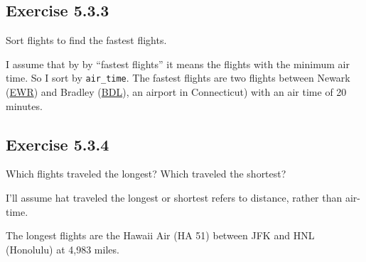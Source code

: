 \documentclass[]{book}
\newenvironment{Shaded}{\begin{snugshade}}{\end{snugshade}}
\newcommand{\CommentTok}[1]{\textcolor[rgb]{0.56,0.35,0.01}{\textit{#1}}}
\newcommand{\KeywordTok}[1]{\textcolor[rgb]{0.13,0.29,0.53}{\textbf{#1}}}
\newcommand{\NormalTok}[1]{#1}
\newcommand{\OperatorTok}[1]{\textcolor[rgb]{0.81,0.36,0.00}{\textbf{#1}}}
\newcommand{\StringTok}[1]{\textcolor[rgb]{0.31,0.60,0.02}{#1}}
\theoremstyle{plain}
\theoremstyle{remark}
\begin{document}
\hypertarget{exercise-5.3.3}{%
\subsection*{\texorpdfstring{Exercise
{5.3.3}}{Exercise 5.3.3}}\label{exercise-5.3.3}}

Sort flights to find the fastest flights.

I assume that by by ``fastest flights'' it means the flights with the
minimum air time. So I sort by \texttt{air\_time}. The fastest flights
are two flights between Newark
(\href{https://en.wikipedia.org/wiki/Newark_Liberty_International_Airport}{EWR})
and Bradley
(\href{https://en.wikipedia.org/wiki/Bradley_International_Airport}{BDL}),
an airport in Connecticut) with an air time of 20 minutes.

\begin{Shaded}
\end{Shaded}

\hypertarget{exercise-5.3.4}{%
\subsection*{\texorpdfstring{Exercise
{5.3.4}}{Exercise 5.3.4}}\label{exercise-5.3.4}}

Which flights traveled the longest? Which traveled the shortest?

I'll assume hat traveled the longest or shortest refers to distance,
rather than air-time.

The longest flights are the Hawaii Air (HA 51) between JFK and HNL
(Honolulu) at 4,983 miles.
\end{document}
